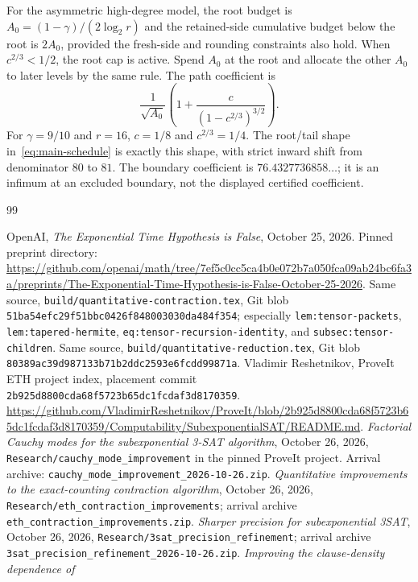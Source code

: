 \documentclass[11pt,letterpaper]{article}
\theoremstyle{remark}\newtheorem{remark}[theorem]{Remark}
\newcommand{\sourceurl}[1]{\url{#1}}
\begin{document}
For the asymmetric high-degree model, the root budget is
$A_0=(1-\gamma)/(2\log_2r)$ and the retained-side cumulative budget
below the root is $2A_0$, provided the fresh-side and rounding constraints
also hold. When $c^{2/3}<1/2$, the root cap is active. Spend $A_0$ at the
root and allocate the other $A_0$ to later levels by the same rule.
The path coefficient is
\[
 \frac1{\sqrt{A_0}}
 \left(1+\frac{c}{(1-c^{2/3})^{3/2}}\right).
\]
For $\gamma=9/10$ and $r=16$, $c=1/8$ and $c^{2/3}=1/4$.
The root/tail shape in~\eqref{eq:main-schedule} is exactly this shape,
with strict inward shift from denominator $80$ to $81$.
The boundary coefficient is $76.4327736858\ldots$; it is an infimum at
an excluded boundary, not the displayed certified coefficient.

\begin{thebibliography}{99}
\raggedright
{} OpenAI, \emph{The Exponential Time Hypothesis is False},
October 25, 2026. Pinned preprint directory:
\sourceurl{https://github.com/openai/math/tree/7ef5c0cc5ca4b0e072b7a050fca09ab24bc6fa3a/preprints/The-Exponential-Time-Hypothesis-is-False-October-25-2026}.
 Same source, \texttt{build/quantitative-contraction.tex},
Git blob \texttt{51ba54efc29f51bbc0426f848003030da484f354}; especially
\texttt{lem:tensor-packets}, \texttt{lem:tapered-hermite},
\texttt{eq:tensor-recursion-identity}, and \texttt{subsec:tensor-children}.
 Same source, \texttt{build/quantitative-reduction.tex},
Git blob \texttt{80389ac39d987133b71b2ddc2593e6fcdd99871a}.
 Vladimir Reshetnikov, ProveIt ETH project index,
placement commit \texttt{2b925d8800cda68f5723b65dc1fcdaf3d8170359}.
\sourceurl{https://github.com/VladimirReshetnikov/ProveIt/blob/2b925d8800cda68f5723b65dc1fcdaf3d8170359/Computability/SubexponentialSAT/README.md}.
 \emph{Factorial Cauchy modes for the subexponential
3-SAT algorithm}, October 26, 2026, \texttt{Research/cauchy\_mode\_improvement}
in the pinned ProveIt project. Arrival archive:
\texttt{cauchy\_mode\_improvement\_2026-10-26.zip}.
 \emph{Quantitative improvements to the
exact-counting contraction algorithm}, October 26, 2026,
\texttt{Research/eth\_contraction\_improvements}; arrival archive
\texttt{eth\_contraction\_improvements.zip}.
 \emph{Sharper precision for subexponential 3SAT},
October 26, 2026, \texttt{Research/3sat\_precision\_refinement}; arrival
archive \texttt{3sat\_precision\_refinement\_2026-10-26.zip}.
 \emph{Improving the clause-density dependence of
}
\end{thebibliography}
\end{document}

